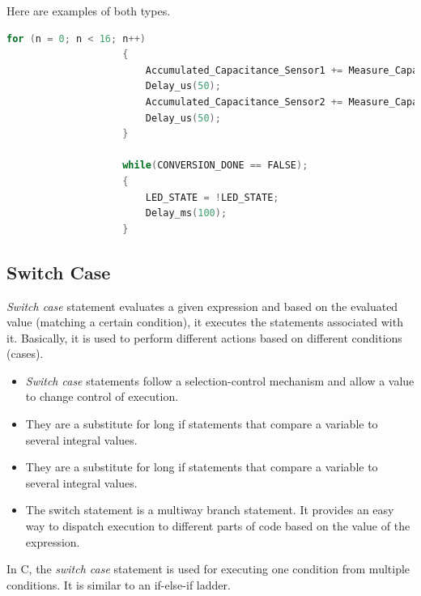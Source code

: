             
            Here are examples of both types.
    
                \begin{lstlisting}[style=mystyle_c, language=c, breaklines]
                    for (n = 0; n < 16; n++)
                    {
                        Accumulated_Capacitance_Sensor1 += Measure_Capacitance(SENSOR_1);
                        Delay_us(50);
                        Accumulated_Capacitance_Sensor2 += Measure_Capacitance(SENSOR_2);
                        Delay_us(50);
                    }
                        
                    while(CONVERSION_DONE == FALSE);
                    {
                        LED_STATE = !LED_STATE;
                        Delay_ms(100);
                    }
                    \end{lstlisting}

                    
        \subsection{Switch Case}
            \textit{Switch case} statement evaluates a given expression and based on the evaluated value (matching a certain condition), it executes the statements associated with it. Basically, it is used to perform different actions based on different conditions (cases). 
        
            \begin{itemize}
                \item \textit{Switch case} statements follow a selection-control mechanism and allow a value to change control of execution.
                \item They are a substitute for long if statements that compare a variable to several integral values.
                \item They are a substitute for long if statements that compare a variable to several integral values.
                \item The switch statement is a multiway branch statement. It provides an easy way to dispatch execution to different parts of code based on the value of the expression.
            \end{itemize}
            
            In C, the \textit{switch case} statement is used for executing one condition from multiple conditions. It is similar to an if-else-if ladder.
        
